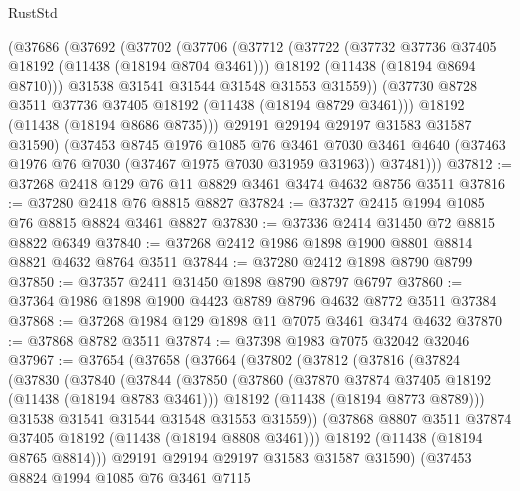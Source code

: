 \begin{lexlean}{RustStd}
\begin{coremodule}
      (@37686
        (@37692
          (@37702
            (@37706
              (@37712
                (@37722
                  (@37732 @37736 @37405 @18192 (@11438 (@18194 @8704 @3461)))
                  @18192
                  (@11438 (@18194 @8694 @8710)))
                @31538
                @31541
                @31544
                @31548
                @31553
                @31559))
            (@37730 @8728 @3511 @37736 @37405 @18192 (@11438 (@18194 @8729 @3461)))
            @18192
            (@11438 (@18194 @8686 @8735)))
          @29191
          @29194
          @29197
          @31583
          @31587
          @31590)
        (@37453
          @8745
          @1976
          @1085
          @76
          @3461
          @7030
          @3461
          @4640
          (@37463 @1976 @76 @7030 (@37467 @1975 @7030 @31959 @31963))
          @37481)))
@37812 := @37268 @2418 @129 @76 @11 @8829 @3461 @3474 @4632 @8756 @3511
@37816 := @37280 @2418 @76 @8815 @8827
@37824 := @37327 @2415 @1994 @1085 @76 @8815 @8824 @3461 @8827
@37830 := @37336 @2414 @31450 @72 @8815 @8822 @6349
@37840 := @37268 @2412 @1986 @1898 @1900 @8801 @8814 @8821 @4632 @8764 @3511
@37844 := @37280 @2412 @1898 @8790 @8799
@37850 := @37357 @2411 @31450 @1898 @8790 @8797 @6797
@37860 := @37364 @1986 @1898 @1900 @4423 @8789 @8796 @4632 @8772 @3511 @37384
@37868 := @37268 @1984 @129 @1898 @11 @7075 @3461 @3474 @4632
@37870 := @37868 @8782 @3511
@37874 := @37398 @1983 @7075 @32042 @32046
@37967 := @37654
    (@37658
      (@37664
        (@37802
          (@37812
            (@37816
              (@37824
                (@37830
                  (@37840
                    (@37844
                      (@37850
                        (@37860
                          (@37870 @37874 @37405 @18192 (@11438 (@18194 @8783 @3461)))
                          @18192
                          (@11438 (@18194 @8773 @8789)))
                        @31538
                        @31541
                        @31544
                        @31548
                        @31553
                        @31559))
                    (@37868 @8807 @3511 @37874 @37405 @18192 (@11438 (@18194 @8808 @3461)))
                    @18192
                    (@11438 (@18194 @8765 @8814)))
                  @29191
                  @29194
                  @29197
                  @31583
                  @31587
                  @31590)
                (@37453
                  @8824
                  @1994
                  @1085
                  @76
                  @3461
                  @7115

\end{coremodule}
\end{lexlean}
